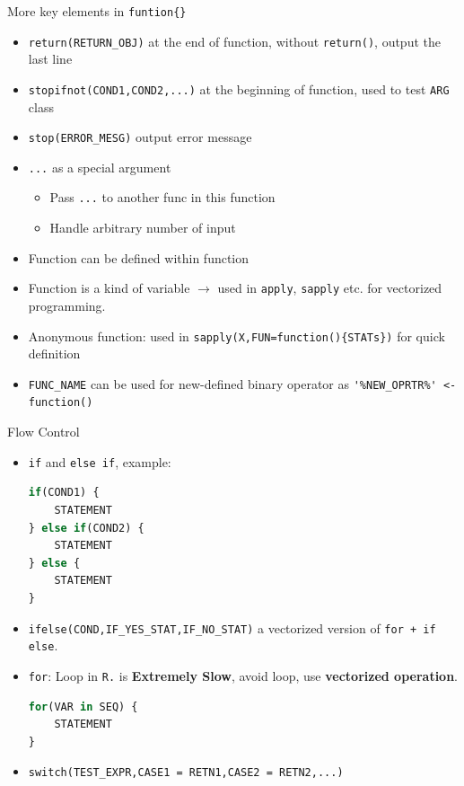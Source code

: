 More key elements in \lstinline|funtion{}|
\begin{itemize}[topsep=2pt,itemsep=0pt]
    \item \lstinline|return(RETURN_OBJ)| at the end of function, without \lstinline|return()|, output the last line
    \item \lstinline|stopifnot(COND1,COND2,...)| at the beginning of function, used to test \lstinline|ARG| class
    \item \lstinline|stop(ERROR_MESG)| output error message
    \item \lstinline|...| as a special argument
    \begin{itemize}[topsep=2pt,itemsep=0pt]
        \item Pass \lstinline|...| to another func in this function
        \item Handle arbitrary number of input
    \end{itemize}
    \item Function can be defined within function
    \item Function is a kind of variable $ \longrightarrow $ used in \lstinline|apply|, \lstinline|sapply| etc. for vectorized programming.
    \item Anonymous function: used in \lstinline|sapply(X,FUN=function(){STATs})| for quick definition
    \item \lstinline|FUNC_NAME| can be used for new-defined binary operator as \lstinline|'%NEW_OPRTR%' <- function()|
\end{itemize}


\begin{point}
    Flow Control
\end{point}

\begin{itemize}[topsep=2pt,itemsep=0pt]
    \item \lstinline|if| and \lstinline|else if|, example:
\begin{lstlisting}[language=R]
if(COND1) {
    STATEMENT
} else if(COND2) {
    STATEMENT
} else {
    STATEMENT
}
\end{lstlisting}
    \item \lstinline|ifelse(COND,IF_YES_STAT,IF_NO_STAT)| a vectorized version of \lstinline|for + if else|.

    \item \lstinline|for|: Loop in \lstinline|R.| is \textbf{Extremely Slow}, avoid loop, use \textbf{vectorized operation}.  
\begin{lstlisting}[language=R]
for(VAR in SEQ) {
    STATEMENT
}
\end{lstlisting}
    \item \lstinline|switch(TEST_EXPR,CASE1 = RETN1,CASE2 = RETN2,...)|
 
    
        
    

\end{itemize}







